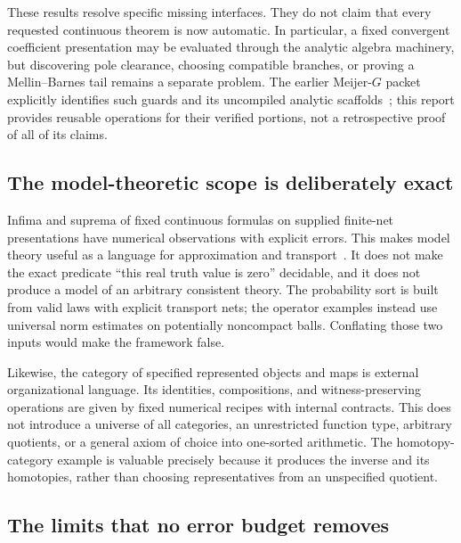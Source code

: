 These results resolve specific missing interfaces. They do not claim that every requested continuous theorem is now automatic. In particular, a fixed convergent coefficient presentation may be evaluated through the analytic algebra machinery, but discovering pole clearance, choosing compatible branches, or proving a Mellin--Barnes tail remains a separate problem. The earlier Meijer-$G$ packet explicitly identifies such guards and its uncompiled analytic scaffolds~\cite{repo-meijer}; this report provides reusable operations for their verified portions, not a retrospective proof of all of its claims.

\subsection{The model-theoretic scope is deliberately exact}

Infima and suprema of fixed continuous formulas on supplied finite-net presentations have numerical observations with explicit errors. This makes model theory useful as a language for approximation and transport~\cite{bbhu2008}. It does not make the exact predicate ``this real truth value is zero'' decidable, and it does not produce a model of an arbitrary consistent theory. The probability sort is built from valid laws with explicit transport nets; the operator examples instead use universal norm estimates on potentially noncompact balls. Conflating those two inputs would make the framework false.

Likewise, the category of specified represented objects and maps is external organizational language. Its identities, compositions, and witness-preserving operations are given by fixed numerical recipes with internal contracts. This does not introduce a universe of all categories, an unrestricted function type, arbitrary quotients, or a general axiom of choice into one-sorted arithmetic. The homotopy-category example is valuable precisely because it produces the inverse and its homotopies, rather than choosing representatives from an unspecified quotient.

\subsection{The limits that no error budget removes}

